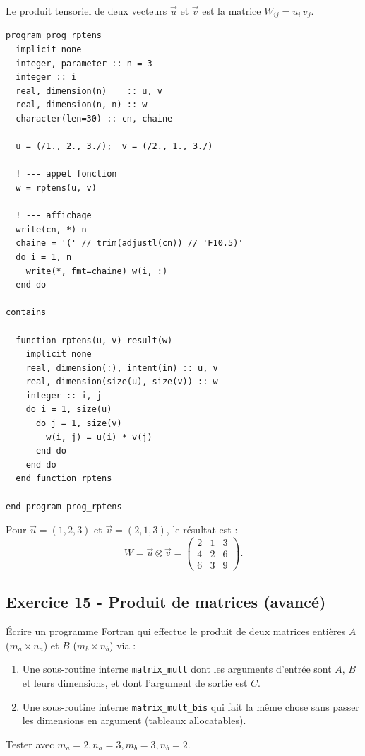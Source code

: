 \documentclass[12pt,a4paper]{article}
\begin{document}
\begin{boitecorrige}
Le produit tensoriel de deux vecteurs $\vec{u}$ et $\vec{v}$ est la matrice $W_{ij} = u_i\,v_j$.
\begin{lstlisting}
program prog_rptens
  implicit none
  integer, parameter :: n = 3
  integer :: i
  real, dimension(n)    :: u, v
  real, dimension(n, n) :: w
  character(len=30) :: cn, chaine

  u = (/1., 2., 3./);  v = (/2., 1., 3./)

  ! --- appel fonction
  w = rptens(u, v)

  ! --- affichage
  write(cn, *) n
  chaine = '(' // trim(adjustl(cn)) // 'F10.5)'
  do i = 1, n
    write(*, fmt=chaine) w(i, :)
  end do

contains

  function rptens(u, v) result(w)
    implicit none
    real, dimension(:), intent(in) :: u, v
    real, dimension(size(u), size(v)) :: w
    integer :: i, j
    do i = 1, size(u)
      do j = 1, size(v)
        w(i, j) = u(i) * v(j)
      end do
    end do
  end function rptens

end program prog_rptens
\end{lstlisting}

Pour $\vec{u}=(1,2,3)$ et $\vec{v}=(2,1,3)$, le résultat est :
\[
W = \vec{u}\otimes\vec{v} =
\begin{pmatrix}2 & 1 & 3\\4 & 2 & 6\\6 & 3 & 9\end{pmatrix}.
\]
\end{boitecorrige}

\subsection*{Exercice 15 - Produit de matrices (avancé) \niveau{\difficile}}

\begin{boiteexercice}
Écrire un programme Fortran qui effectue le produit de deux matrices entières $A$ ($m_a \times n_a$) et $B$ ($m_b \times n_b$) via :
\begin{enumerate}
  \item Une sous-routine interne \texttt{matrix\_mult} dont les arguments d'entrée sont $A$, $B$ et leurs dimensions, et dont l'argument de sortie est $C$.
  \item Une sous-routine interne \texttt{matrix\_mult\_bis} qui fait la même chose sans passer les dimensions en argument (tableaux allocatables).
\end{enumerate}
Tester avec $m_a=2, n_a=3, m_b=3, n_b=2$.
\end{boiteexercice}
\end{document}

